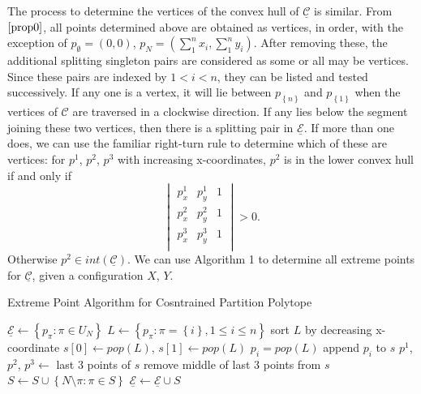 \documentclass{article}
\theoremstyle{case}
\begin{document}
The process to determine the vertices of the convex hull of $\underline{\mathcal{C}}$ is similar. From $\ref{prop0}$, all points determined above are obtained as vertices, in order, with the exception of $p_{\emptyset} = \left( 0,0\right)$, $p_N = \left( \sum_{1}^n x_i, \sum_{1}^n y_i\right)$. After removing these, the additional splitting singleton pairs are considered as some or all may be vertices. Since these pairs are indexed by $1 < i < n$, they can be listed and tested successively. If any one is a vertex, it will lie between $p_{\left\lbrace n\right\rbrace}$ and $p_{\left\lbrace 1\right\rbrace}$ when the vertices of $\mathcal{C}$ are traversed in a clockwise direction. If any lies below the segment joining these two vertices, then there is a splitting pair in $\underline{\mathcal{E}}$. If more than one does, we can use the familiar right-turn rule to determine which of these are vertices: for $p^1$, $p^2$, $p^3$ with increasing x-coordinates, $p^2$ is in the lower convex hull if and only if
\[
\begin{vmatrix} \label{eq8}
p_x^1 & p_y^1 & 1\\
p_x^2 & p_y^2 & 1\\
p_x^3 & p_y^3 & 1\\
\end{vmatrix} > 0.
\]
Otherwise $p^2 \in int\left( \underline{\mathcal{C}}\right)$. We can use Algorithm 1 to determine all extreme points for $\underline{\mathcal{C}}$, given a configuration $X$, $Y$.

\begin{algorithm}
\caption{Extreme Point Algorithm for Cosntrained Partition Polytope }
\begin{algorithmic}[1]
\State $\underline{\mathcal{E}} \leftarrow \left\lbrace p_{\pi} \colon \pi \in U_N\right\rbrace$
\State $L \leftarrow \left\lbrace p_{\pi} \colon \pi = \left\lbrace i\right\rbrace, 1 \leq i \leq n\right\rbrace$
\State sort $L$ by decreasing x-coordinate
\State $s[0] \leftarrow \textit{pop}\left( L\right)$, $s[1] \leftarrow \textit{pop}\left( L\right)$
\State $p_i = \textit{pop}\left( L\right)$
\State append $p_i$ to $s$
\State $p^1$, $p^2$, $p^3 \leftarrow$ last 3 points of $s$
\State remove middle of last 3 points from $s$
\EndIf
\EndFor
\State $S \leftarrow S \cup \left\lbrace N\setminus \pi \colon \pi \in S\right\rbrace$
\State $\underline{\mathcal{E}} \leftarrow \underline{\mathcal{E}} \cup S$\
\end{algorithmic}
\end{algorithm}
\end{document}
